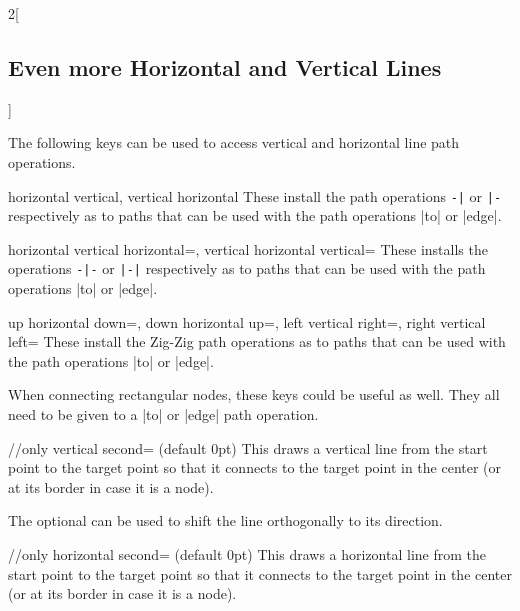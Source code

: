 \begin{multicols*}{2}[\subsection{Even more Horizontal and Vertical Lines}]

The following keys can be used to access vertical and horizontal line path operations.
\begin{keylist}[/\tikzext]{%
  horizontal vertical,
  vertical horizontal}
  These install the path operations \verb!-|! or \verb!|-! respectively as to paths%
   that can be used with the path operations |to| or |edge|.
\end{keylist}
\begin{keylist}[/tikzext]{%
  horizontal vertical horizontal=,
  vertical horizontal vertical=}
  These installs the operations \verb!-|-! or \verb!|-|! respectively as to paths
  that can be used with the path operations |to| or |edge|.
\end{keylist}
\begin{keylist}[/\tikzext]{%
  up horizontal down=,
  down horizontal up=,
  left vertical right=,
  right vertical left=}
  These install the Zig-Zig path operations as to paths
  that can be used with the path operations |to| or |edge|.
\end{keylist}

When connecting rectangular nodes, these keys could be useful as well.
They all need to be given to a |to| or |edge| path operation.
\begin{stylekey}{/\tikzext/only vertical second= (default 0pt)}
This draws a vertical line from the start point to the target point so that
it connects to the target point in the center (or at its border in case it is a node).

The optional  can be used to shift the line orthogonally to its direction.
\end{stylekey}
\begin{stylekey}{/\tikzext/only horizontal second= (default 0pt)}
This draws a horizontal line from the start point to the target point so that
it connects to the target point in the center (or at its border in case it is a node).


\end{stylekey}
\end{multicols*}
